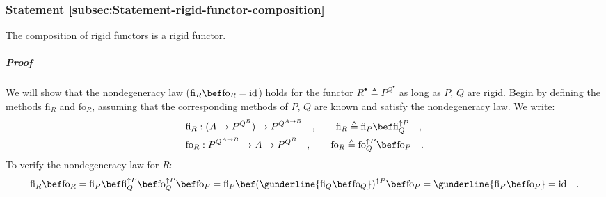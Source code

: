 \subsubsection{Statement \label{subsec:Statement-rigid-functor-composition}\ref{subsec:Statement-rigid-functor-composition}}

The composition of rigid functors is a rigid functor.

\subparagraph{Proof}

We will show that the nondegeneracy law ($\text{fi}_{R}\bef\text{fo}_{R}=\text{id}$)
holds for the functor $R^{\bullet}\triangleq P^{Q^{\bullet}}$ as
long as $P$, $Q$ are rigid. Begin by defining the methods $\text{fi}_{R}$
and $\text{fo}_{R}$, assuming that the corresponding methods of $P$,
$Q$ are known and satisfy the nondegeneracy law. We write:
\begin{align*}
 & \text{fi}_{R}:(A\rightarrow P^{Q^{B}})\rightarrow P^{Q^{A\rightarrow B}}\quad,\quad\quad\text{fi}_{R}\triangleq\text{fi}_{P}\bef\text{fi}_{Q}^{\uparrow P}\quad,\\
 & \text{fo}_{R}:P^{Q^{A\rightarrow B}}\rightarrow A\rightarrow P^{Q^{B}}\quad,\quad\quad\text{fo}_{R}\triangleq\text{fo}_{Q}^{\uparrow P}\bef\text{fo}_{P}\quad.
\end{align*}
To verify the nondegeneracy law for $R$:
\[
\text{fi}_{R}\bef\text{fo}_{R}=\text{fi}_{P}\bef\text{fi}_{Q}^{\uparrow P}\bef\text{fo}_{Q}^{\uparrow P}\bef\text{fo}_{P}=\text{fi}_{P}\bef(\gunderline{\text{fi}_{Q}\bef\text{fo}_{Q}})^{\uparrow P}\bef\text{fo}_{P}=\gunderline{\text{fi}_{P}\bef\text{fo}_{P}}=\text{id}\quad.
\]
